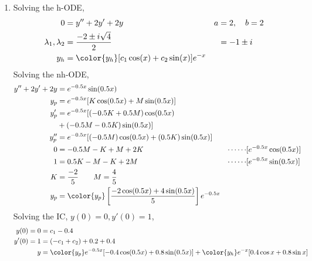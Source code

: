 \begin{enumerate}
    \item Solving the h-ODE,
          \begin{align}
              0                        & = y'' + 2y' + 2y              &
              a                        & = 2, \quad b = 2                \\
              \lambda_{1}, \lambda_{2} & = \frac{-2 \pm i\sqrt{4}}{2}  &
                                       & = -1 \pm i                      \\
              y_{h}                    & = \color{y_h} [c_{1}\cos(x) +
                  c_{2}\sin(x)]e^{-x}
          \end{align}
          Solving the nh-ODE,
          \begin{align}
              y'' + 2y' + 2y & = e^{-0.5x}\sin(0.5x)                               \\
              y_{p}          & = e^{-0.5x}[K\cos(0.5x) + M\sin(0.5x)]              \\
              y_{p}'         & = e^{-0.5x}[(-0.5K + 0.5M)\cos(0.5x)                \\
                             & + (-0.5M - 0.5K)\sin(0.5x)]                         \\
              y_{p}''        & = e^{-0.5x}[(-0.5M)\cos(0.5x) + (0.5K)\sin(0.5x)]   \\
              0              & = -0.5M -K + M + 2K                               &
              \cdots\cdots   & [e^{-0.5x}\cos(0.5x)]                               \\
              1              & = 0.5K - M - K + 2M                               &
              \cdots\cdots   & [e^{-0.5x}\sin(0.5x)]                               \\
              K              & = \frac{-2}{5} \qquad M = \frac{4}{5}               \\
              y_{p}          & = \color{y_p} \left[ \frac{-2\cos(0.5x)
                      + 4\sin(0.5x)}{5} \right] e^{-0.5x}
          \end{align}
          Solving the IC, $ y(0) = 0, y'(0) = 1 $,
          \begin{align}
              y(0) = 0  & = c_{1} - 0.4                                             \\
              y'(0) = 1 & = (-c_{1} + c_{2}) + 0.2 + 0.4                            \\
              y         & = {\color{y_p} e^{-0.5x}[-0.4\cos(0.5x) + 0.8\sin(0.5x)]}
              + {\color{y_h} e^{-x}[0.4\cos x + 0.8\sin x]}
          \end{align}


\end{enumerate}
